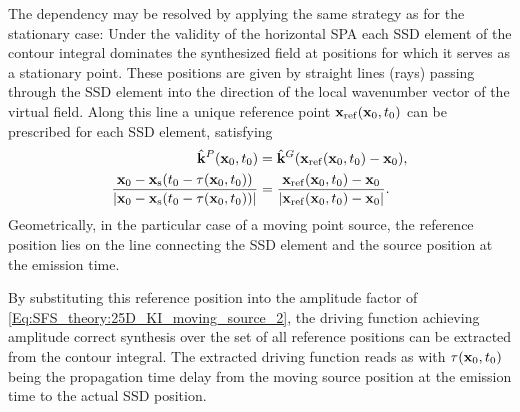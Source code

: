 The dependency may be resolved by applying the same strategy as for the stationary case:
Under the validity of the horizontal SPA each SSD element of the contour integral dominates the synthesized field at positions for which it serves as a stationary point.
These positions are given by straight lines (rays) passing through the SSD element into the direction of the local wavenumber vector of the virtual field.
Along this line a unique reference point $\mathbf{x}_{\mathrm{ref}}(\mathbf{x}_0,t_0)$ can be prescribed for each SSD element, satisfying
\begin{align}
\label{Eq:SFS_theory:25D_WFS_ref_point}
\hat{\mathbf{k}}^P(\mathbf{x}_0,t_0) &= \hat{\mathbf{k}}^G(\mathbf{x}_{\mathrm{ref}}(\mathbf{x}_0,t_0)-\mathbf{x}_0),
\\
\frac{\mathbf{x}_0 -\mathbf{x}_{\mathrm{s}}(t_0-\tau(\mathbf{x}_0,t_0))}{|\mathbf{x}_0-\mathbf{x}_{\mathrm{s}}(t_0 - \tau(\mathbf{x}_0,t_0))|} &=  \frac{\mathbf{x}_{\mathrm{ref}}(\mathbf{x}_0,t_0)-\mathbf{x}_0}{|\mathbf{x}_{\mathrm{ref}}(\mathbf{x}_0,t_0)-\mathbf{x}_0|}.
\end{align}
Geometrically, in the particular case of a moving point source, the reference position lies on the line connecting the SSD element and the source position at the emission time.

By substituting this reference position into the amplitude factor of \eqref{Eq:SFS_theory:25D_KI_moving_source_2}, the driving function achieving amplitude correct synthesis over the set of all reference positions can be extracted from the contour integral.
The extracted driving function reads as
with $\tau(\mathbf{x}_0,t_0)$ being the propagation time delay from the moving source position at the emission time to the actual SSD position.%

